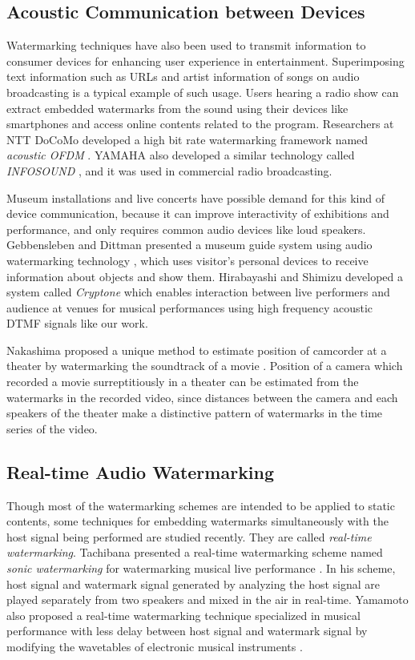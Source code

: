 \subsection{Acoustic Communication between Devices}
Watermarking techniques have also been used to transmit information to consumer devices for enhancing user experience in entertainment.
Superimposing text information such as URLs and artist information of songs on audio broadcasting is a typical example of such usage.
Users hearing a radio show can extract embedded watermarks from the sound using their devices like smartphones and access online contents related to the program.
Researchers at NTT DoCoMo developed a high bit rate watermarking framework named {\it acoustic OFDM} \cite{matsuoka2008acoustic}. YAMAHA also developed a similar technology called {\it INFOSOUND} \cite{infosound}, and it was used in commercial radio broadcasting.

Museum installations and live concerts have possible demand for this kind of device communication, because it can improve interactivity of exhibitions and performance, and only requires common audio devices like loud speakers.
Gebbensleben and Dittman presented a museum guide system using audio watermarking technology \cite{gebbensleben2006multimodal}, which uses visitor's personal devices to receive information about objects and show them.
Hirabayashi and Shimizu developed a system called {\it Cryptone} which enables interaction between live performers and audience at venues for musical performances using high frequency acoustic DTMF signals like our work. \cite{Hirabayashi:2012:CIP:2407707.2407712}

Nakashima proposed a unique method to estimate position of camcorder at a theater by watermarking the soundtrack of a movie \cite{nakashima2009watermarked}.
Position of a camera which recorded a movie surreptitiously in a theater can be estimated from the watermarks in the recorded video, since distances between the camera and each speakers of the theater make a distinctive pattern of watermarks in the time series of the video.

\subsection{Real-time Audio Watermarking}
Though most of the watermarking schemes are intended to be applied to static contents, some techniques for embedding watermarks simultaneously with the host signal being performed are studied recently. They are called {\it real-time watermarking}.
Tachibana presented a real-time watermarking scheme named {\it sonic watermarking} for watermarking musical live performance \cite{tachibana2003audio}. In his scheme, host signal and watermark signal generated by analyzing the host signal are played separately from two speakers and mixed in the air in real-time.
Yamamoto also proposed a real-time watermarking technique specialized in musical performance with less delay between host signal and watermark signal by modifying the wavetables of electronic musical instruments \cite{yamamoto2010real}.
